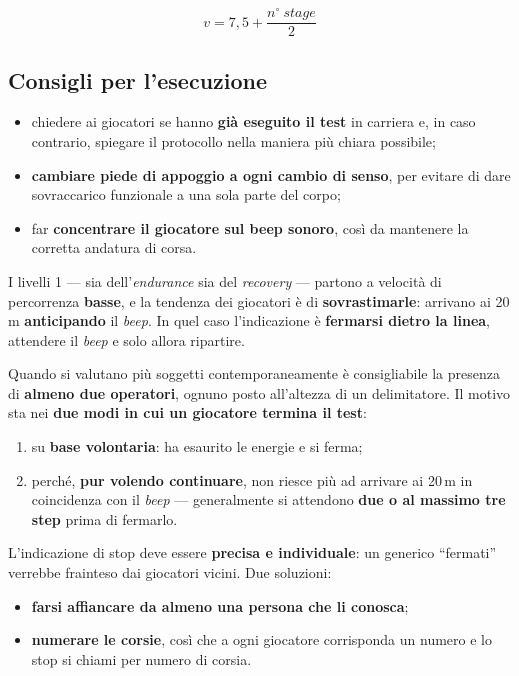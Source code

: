 \[
  v = 7,5 + \frac{n^\circ\ stage}{2}
\]

\subsection{Consigli per l'esecuzione}

\begin{itemize}
  \item chiedere ai giocatori se hanno \textbf{già eseguito il test} in carriera e, in caso
    contrario, spiegare il protocollo nella maniera più chiara possibile;
  \item \textbf{cambiare piede di appoggio a ogni cambio di senso}, per evitare di dare
    sovraccarico funzionale a una sola parte del corpo;
  \item far \textbf{concentrare il giocatore sul beep sonoro}, così da mantenere la corretta
    andatura di corsa.
\end{itemize}

I livelli 1 --- sia dell'\textit{endurance} sia del \textit{recovery} --- partono a velocità di
percorrenza \textbf{basse}, e la tendenza dei giocatori è di \textbf{sovrastimarle}: arrivano ai
20\,m \textbf{anticipando} il \textit{beep}. In quel caso l'indicazione è \textbf{fermarsi dietro
la linea}, attendere il \textit{beep} e solo allora ripartire.

Quando si valutano più soggetti contemporaneamente è consigliabile la presenza di \textbf{almeno
due operatori}, ognuno posto all'altezza di un delimitatore. Il motivo sta nei \textbf{due modi in
cui un giocatore termina il test}:

\begin{enumerate}
  \item su \textbf{base volontaria}: ha esaurito le energie e si ferma;
  \item perché, \textbf{pur volendo continuare}, non riesce più ad arrivare ai 20\,m in coincidenza
    con il \textit{beep} --- generalmente si attendono \textbf{due o al massimo tre step} prima di
    fermarlo.
\end{enumerate}

L'indicazione di stop deve essere \textbf{precisa e individuale}: un generico ``fermati'' verrebbe
frainteso dai giocatori vicini. Due soluzioni:

\begin{itemize}
  \item \textbf{farsi affiancare da almeno una persona che li conosca};
  \item \textbf{numerare le corsie}, così che a ogni giocatore corrisponda un numero e lo stop si
    chiami per numero di corsia.
\end{itemize}

